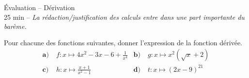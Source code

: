 \documentclass[11pt]{article}
\begin{document}
\begin{center}
  {\Huge Évaluation -- Dérivation}\\
  25 min -- \emph{La rédaction/justification des calculs entre dans une part
  importante du barème.}
\end{center}

\noindent Pour chacune des fonctions suivantes, donner l'expression de la fonction
dérivée.
\begin{align*}
  \textbf{a)}\; & f:x\mapsto 4x^2-3x-6+\frac{1}{x^4} &
  \textbf{b)}\; & g:x\mapsto x^2(\sqrt x+2) \\
  \textbf{c)}\; & h:x\mapsto \frac{x+1}{x^2-1} &
  \textbf{d)}\; & t:x\mapsto (2x-9)^{21}
\end{align*}
\end{document}
